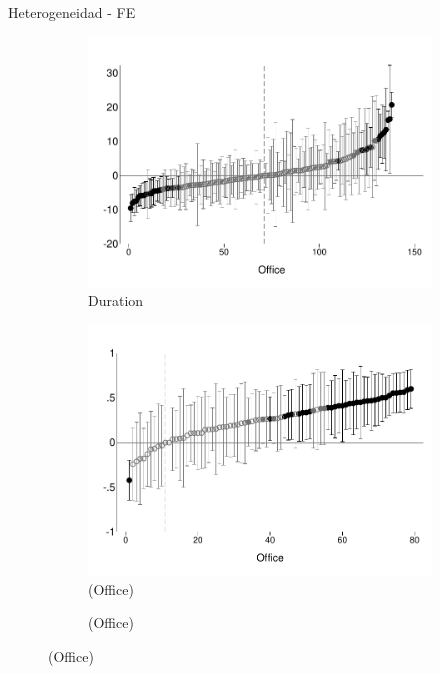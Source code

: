 \documentclass[8pt]{beamer}
\begin{document}
\begin{frame}[allowframebreaks]{Heterogeneidad - FE}
\begin{figure}[H]
\begin{center}
\begin{subfigure}{0.25\textwidth}
        \end{subfigure}
                \begin{subfigure}{0.25\textwidth}
            \caption*{Duration}
            \centering
            \includegraphics[width=\textwidth]{Figuras/betas_duration.pdf}
        \end{subfigure}
             \begin{subfigure}{0.25\textwidth}
    \caption*{(Office)}
            \centering
            \includegraphics[width=\textwidth]{Figuras/betas_desp_pos_rec.pdf}
        \end{subfigure}        
     \begin{subfigure}{0.25\textwidth}
            \caption*{(Office)}
            \centering

\end{subfigure}
\end{center}
\end{figure}
\end{frame}
\end{document}
